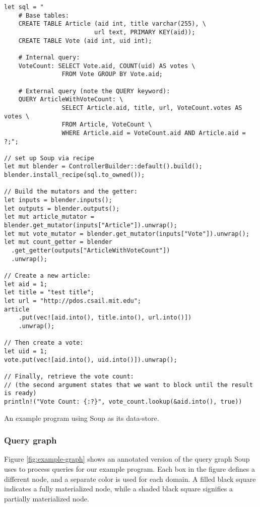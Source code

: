 \documentclass[b5paper]{report}
\begin{document}
\begin{listing}[H]
  \begin{verbatim}
let sql = "
    # Base tables:
    CREATE TABLE Article (aid int, title varchar(255), \
                         url text, PRIMARY KEY(aid));
    CREATE TABLE Vote (aid int, uid int);

    # Internal query:
    VoteCount: SELECT Vote.aid, COUNT(uid) AS votes \
                FROM Vote GROUP BY Vote.aid;

    # External query (note the QUERY keyword):
    QUERY ArticleWithVoteCount: \
                SELECT Article.aid, title, url, VoteCount.votes AS votes \
                FROM Article, VoteCount \
                WHERE Article.aid = VoteCount.aid AND Article.aid = ?;";

// set up Soup via recipe
let mut blender = ControllerBuilder::default().build();
blender.install_recipe(sql.to_owned());

// Build the mutators and the getter:
let inputs = blender.inputs();
let outputs = blender.outputs();
let mut article_mutator = blender.get_mutator(inputs["Article"]).unwrap();
let mut vote_mutator = blender.get_mutator(inputs["Vote"]).unwrap();
let mut count_getter = blender
  .get_getter(outputs["ArticleWithVoteCount"])
  .unwrap();

// Create a new article:
let aid = 1;
let title = "test title";
let url = "http://pdos.csail.mit.edu";
article
    .put(vec![aid.into(), title.into(), url.into()])
    .unwrap();

// Then create a vote:
let uid = 1;
vote.put(vec![aid.into(), uid.into()]).unwrap();

// Finally, retrieve the vote count:
// (the second argument states that we want to block until the result is ready)
println!("Vote Count: {:?}", vote_count.lookup(&aid.into(), true))
  \end{verbatim}
  \caption{
    An example program using Soup as its data-store.
    \label{lst:soup-example}
  }
\end{listing}

\subsubsection{Query graph}
Figure \ref{fig:example-graph} shows an annotated version of the query graph
Soup uses to process queries for our example program. Each box in the figure
defines a different node, and a separate color is used for each domain. A filled
black square indicates a fully materialized node, while a shaded black
square signifies a partially materialized node.
\end{document}
